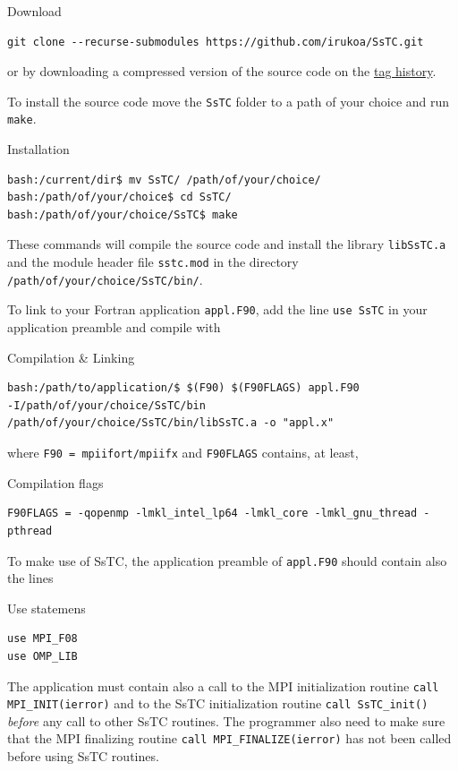 \documentclass[10pt,a4paper]{article}
\begin{document}
\begin{codebox}{Download}
\begin{verbatim}
git clone --recurse-submodules https://github.com/irukoa/SsTC.git
\end{verbatim}
\end{codebox}
or by downloading a compressed version of the source code on the \href{https://github.com/irukoa/SsTC/tags}{tag history}.

To install the source code move the \verb|SsTC| folder to a path of your choice and run \verb|make|.
\begin{codebox}{Installation}
\begin{verbatim}
bash:/current/dir$ mv SsTC/ /path/of/your/choice/
bash:/path/of/your/choice$ cd SsTC/
bash:/path/of/your/choice/SsTC$ make
\end{verbatim}
\end{codebox}
These commands will compile the source code and install the library \verb|libSsTC.a| and the module header file \verb|sstc.mod| in the directory \verb|/path/of/your/choice/SsTC/bin/|.

To link to your Fortran application \verb|appl.F90|, add the line \verb|use SsTC| in your application preamble and compile with 
\begin{codebox}{Compilation \& Linking}
\begin{verbatim}
bash:/path/to/application/$ $(F90) $(F90FLAGS) appl.F90 
-I/path/of/your/choice/SsTC/bin 
/path/of/your/choice/SsTC/bin/libSsTC.a -o "appl.x"
\end{verbatim}
\end{codebox}
where \verb|F90 = mpiifort/mpiifx| and \verb|F90FLAGS| contains, at least,
\begin{codebox}{Compilation flags}
\begin{verbatim}
F90FLAGS = -qopenmp -lmkl_intel_lp64 -lmkl_core -lmkl_gnu_thread -pthread
\end{verbatim}
\end{codebox}

To make use of SsTC, the application preamble of \verb|appl.F90| should contain also the lines 
\begin{codebox}{Use statemens}
\begin{verbatim}
use MPI_F08
use OMP_LIB
\end{verbatim}
\end{codebox}
The application must contain also a call to the MPI \cite{messagepassinginterfaceforumMPIMessagePassingInterface2021} initialization routine \verb|call MPI_INIT(ierror)| and to the SsTC initialization routine \verb|call SsTC_init()| \textit{before} any call to other SsTC routines. The programmer also need to make sure that the MPI finalizing routine \verb|call MPI_FINALIZE(ierror)| has not been called before using SsTC routines.
\end{document}
